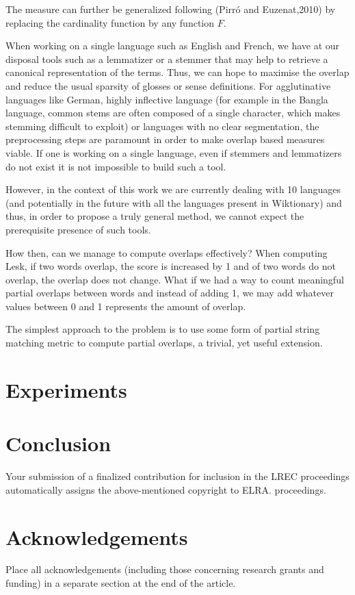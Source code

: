 \documentclass[10pt, a4paper]{article}
\begin{document}
The measure can further be generalized following (Pirró and Euzenat,2010) by replacing the cardinality function by any function \(F\).


 When working on a single language such as English and French, we have at our disposal tools such as a lemmatizer or a stemmer that may help to retrieve a canonical representation of the terms. Thus, we can hope to maximise the overlap and reduce the usual sparsity of glosses or sense definitions. For agglutinative languages like German, highly inflective language (for example in the Bangla language, common stems are often composed of a single character, which makes stemming difficult to exploit) or languages with no clear segmentation, the preprocessing steps are paramount in order to make overlap based measures viable. If one is working on a single language, even if stemmers and lemmatizers do not exist it is not impossible to build such a tool.

However, in the context of this work we are currently dealing with 10 languages (and potentially in the future with all the languages present in Wiktionary) and thus, in order to propose a truly general method, we cannot expect the prerequisite presence of such tools. 

How then, can we manage to compute overlaps effectively? When computing Lesk, if two words overlap, the score is increased by 1 and of two words do not overlap, the overlap does not change. What if we had a way to count meaningful partial overlaps between words and instead of adding 1, we may add whatever values between 0 and 1 represents the amount of overlap.

The simplest approach to the problem is to use some form of partial string matching metric to compute partial overlaps, a trivial, yet useful extension. 




\section{Experiments}



\section{Conclusion}

Your submission of a finalized contribution for inclusion in the LREC proceedings automatically assigns the above-mentioned copyright to ELRA.
proceedings.

\section{Acknowledgements}

Place all acknowledgements (including those concerning research grants and funding) in a separate section at the end of the article.




\end{document}
